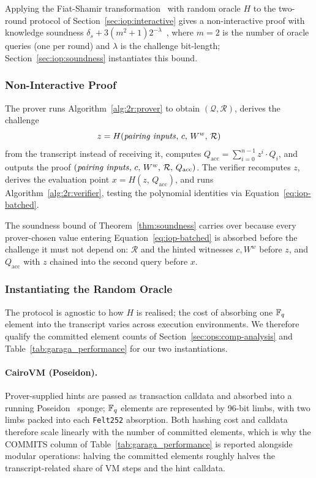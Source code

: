 Applying the Fiat-Shamir transformation~\cite{C:FiaSha86} with random oracle $H$ to the two-round protocol of Section~\ref{sec:iop:interactive} gives a non-interactive proof with knowledge soundness $\delta_s + 3(m^2+1)2^{-\lambda}$~\cite{TCC:BenChiSpo16}, where $m=2$ is the number of oracle queries (one per round) and $\lambda$ is the challenge bit-length; Section~\ref{sec:iop:soundness} instantiates this bound.

\subsubsection{Non-Interactive Proof} \label{sec:iop:noninteractive}

The prover runs Algorithm~\ref{alg:2r:prover} to obtain $(\mathcal{Q}, \mathcal{R})$, derives the challenge
$$z = H(\text{\textit{pairing inputs}},\, c,\, W^w,\, \mathcal{R})$$
from the transcript instead of receiving it, computes $Q_{\text{acc}} = \sum_{i=0}^{n-1} z^i \cdot Q_i$, and outputs the proof $(\text{\textit{pairing inputs}},\, c,\, W^w,\, \mathcal{R},\, Q_\text{acc})$. The verifier recomputes $z$, derives the evaluation point $x = H(z,\, Q_\text{acc})$, and runs Algorithm~\ref{alg:2r:verifier}, testing the polynomial identities via Equation~\eqref{eq:iop-batched}.

The soundness bound of Theorem~\ref{thm:soundness} carries over because every prover-chosen value entering Equation~\eqref{eq:iop-batched} is absorbed before the challenge it must not depend on: $\mathcal{R}$ and the hinted witnesses $c, W^w$ before $z$, and $Q_\text{acc}$ with $z$ chained into the second query before $x$.

\subsubsection{Instantiating the Random Oracle}\label{sec:iop:fs:ro}

The protocol is agnostic to how $H$ is realised; the cost of absorbing one $\mathbb{F}_q$ element into the transcript varies across execution environments. We therefore qualify the committed element counts of Section~\ref{sec:ops:comp-analysis} and Table~\ref{tab:garaga_performance} for our two instantiations.

\paragraph{CairoVM (Poseidon).} \label{sec:iop:fs:cairo}
Prover-supplied hints are passed as transaction calldata and absorbed into a running Poseidon~\cite{USENIX:GKRRS21} sponge; $\mathbb{F}_q$ elements are represented by 96-bit limbs, with two limbs packed into each \texttt{Felt252} absorption. Both hashing cost and calldata therefore scale linearly with the number of committed elements, which is why the COMMITS column of Table~\ref{tab:garaga_performance} is reported alongside modular operations: halving the committed elements roughly halves the transcript-related share of VM steps and the hint calldata.

